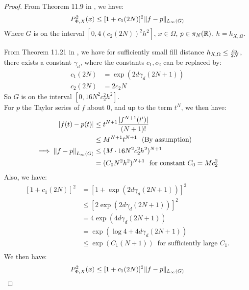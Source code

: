 \documentclass[twoside]{memoir}
\begin{document}
\begin{proof}
	From Theorem 11.9 in \cite{ScatteredDataApproximation}, we have:
	\[ P_{\Phi, X}^2(x) \leq [1 + c_1(2N)]^2 \lVert f - p\rVert_{L_\infty(G)} \]
	Where $G$ is on the interval $[0, 4(c_2(2N))^2h^2]$, $x \in \Omega$, $p \in \pi_N(\mathbb{R})$, $h = h_{X, \Omega}$.
	
	From Theorem 11.21 in \cite{ScatteredDataApproximation}, we have for sufficiently small fill distance $h_{X,\Omega} \leq \frac{c_0}{2N}$, there exists a constant $\gamma_d$, where the constants $c_1, c_2$ can be replaced by:
	\begin{equation*}
	\begin{split}
	c_1(2N) &= \exp(2d\gamma_d(2N+1))\\
	c_2(2N) &= 2c_2N
	\end{split}
	\end{equation*}
	So $G$ is on the interval $[0, 16N^2c_2^2h^2]$.\\
	For $p$ the Taylor series of $f$ about 0, and up to the term $t^N$, we then have:
	\begin{equation*}
	\begin{split}
	|f(t) - p(t)| &\leq t^{N+1}\frac{|f^{N+1}(t')|}{(N+1)!} \\
	&\leq M^{N+1}t^{N+1} ~ \text{ (By assumption)} \\
	\implies {\lVert f - p\rVert}_{L_\infty(G)} &\leq (M \cdot 16N^2c_2^2h^2)^{N+1} \\
	&= (C_0 N^2 h^2)^{N+1} ~ \text{ for constant }C_0 = Mc_2^2 \\
	\end{split}
	\end{equation*}
	Also, we have:
	\begin{equation*}
	\begin{split}
	[1 + c_1(2N)]^2 &= [1 + \exp(2d\gamma_d(2N + 1))]^2 \\
	&\leq [2\exp(2d\gamma_d(2N + 1))]^2 \\
	&= 4\exp(4d\gamma_d(2N + 1)) \\
	&= \exp(\log 4 + 4d\gamma_d(2N + 1)) \\
	&\leq \exp(C_1(N+1)) ~ \text{ for sufficiently large }C_1.\\
	\end{split}
	\end{equation*}
	We then have:
	\begin{equation} \label{eqn:P2bound}
	\begin{split}
	P^2_{\Phi, X}(x) &\leq [1 + c_1(2N)]^2 \norm{f - p}_{L_\infty(G)} \\

\end{split}
\end{equation}
\end{proof}
\end{document}
